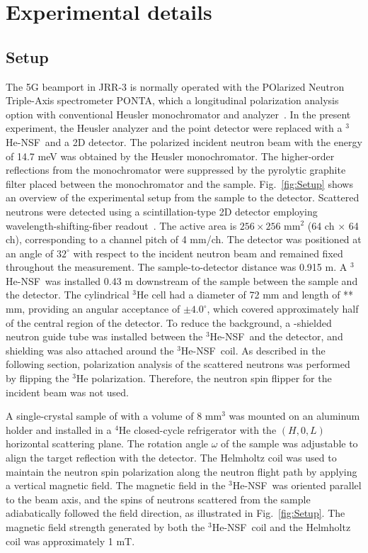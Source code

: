 \documentclass[%
 reprint,
superscriptaddress,
 amsmath,amssymb,
 aps,
floatfix,
]{revtex4-2}
\newcommand{\He}{$^3$He }
\newcommand{\Hensf}{$^3$He-NSF}
\begin{document}
\section{Experimental details}


\subsection{Setup}
The 5G beamport in JRR-3 is normally operated with the POlarized Neutron Triple-Axis spectrometer PONTA, which a longitudinal polarization analysis option with conventional Heusler monochromator and analyzer~\cite{nakajima_polarized_2024}.
In the present experiment, the Heusler analyzer and the point detector were replaced with a \Hensf\ and a 2D detector. 
The polarized incident neutron beam with the energy of 14.7 meV was obtained by the Heusler monochromator. 
The higher-order reflections from the monochromator were suppressed by the pyrolytic graphite filter placed between the monochromator and the sample. 
Fig.~\ref{fig:Setup} shows an overview of the experimental setup from the sample to the detector.
Scattered neutrons were detected using a scintillation-type 2D detector employing wavelength-shifting-fiber readout~\cite{nakamura_large-area_2012}.
The active area is \(256 \times 256\) mm$^2$ (64 ch $\times$ 64 ch), corresponding to a channel pitch of 4 mm/ch.
The detector was positioned at an angle of \(32^\circ\) with respect to the incident neutron beam and remained fixed throughout the measurement.
The sample-to-detector distance was 0.915 m.
A \Hensf~was installed 0.43 m downstream of the sample between the sample and the detector.
The cylindrical \He cell had a diameter of 72 mm and length of ** mm, providing an angular acceptance of \(\pm4.0^\circ\), which covered approximately half of the central region of the detector.
To reduce the background, a -shielded neutron guide tube was installed between the \Hensf~and the detector, and  shielding was also attached around the \Hensf~coil.
As described in the following section, polarization analysis of the scattered neutrons was performed by flipping the \He polarization.
Therefore, the neutron spin flipper for the incident beam was not used.

A single-crystal sample of  with a volume of 8 mm$^3$ was mounted on an aluminum holder and installed in a $^4$He closed-cycle refrigerator with the $(H,0,L)$ horizontal scattering plane. 
The rotation angle $\omega$ of the sample was adjustable to align the target reflection with the detector.
The Helmholtz coil was used to maintain the neutron spin polarization along the neutron flight path by applying a vertical magnetic field.
The magnetic field in the \Hensf~was oriented parallel to the beam axis, and the spins of neutrons scattered from the sample adiabatically followed the field direction, as illustrated in Fig.~\ref{fig:Setup}.
The magnetic field strength generated by both the \Hensf~coil and the Helmholtz coil was approximately 1 mT.
\end{document}
